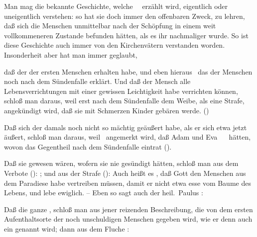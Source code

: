 Man mag die bekannte Geschichte, welche \ \ erzählt wird, eigentlich oder uneigentlich verstehen: so hat sie doch immer den offenbaren Zweck, zu lehren, daß sich die Menschen unmittelbar nach der Schöpfung in einem weit vollkommeneren Zustande befunden hätten, als es ihr nachmaliger wurde. So ist diese Geschichte auch immer von den Kirchenvätern verstanden worden. Insonderheit aber hat man immer geglaubt,
\begin{aufza}
\item daß der  der ersten Menschen  erhalten habe, und eben hieraus \zB\ das  der Menschen noch nach dem Sündenfalle erklärt. Und daß der Mensch alle Lebensverrichtungen mit einer gewissen Leichtigkeit habe verrichten können, schloß man daraus, weil erst nach dem Sündenfalle dem Weibe, als eine Strafe, angekündigt wird, daß sie mit Schmerzen Kinder gebären werde. ()
\item Daß sich der  damals noch nicht so mächtig geäußert habe, als er sich etwa jetzt äußert, schloß man daraus, weil \ angemerkt wird, daß Adam und Eva ~\  hätten, wovon das Gegentheil nach dem Sündenfalle eintrat ().
\item Daß sie  gewesen wären, wofern sie nie gesündigt hätten, schloß man aus dem Verbote (): ; und aus der Strafe ():
 Auch heißt es , daß Gott den Menschen aus dem Paradiese habe vertreiben müssen, damit er nicht etwa esse vom Baume des Lebens, und lebe ewiglich. -- Eben so sagt auch der heil.\ Paulus : 
\item Daß die ganze , schloß man aus jener reizenden Beschreibung, die von dem ersten Aufenthaltsorte der noch unschuldigen Menschen gegeben wird, wie er denn auch ein  genannt wird; dann aus dem Fluche : 

\end{aufza}
